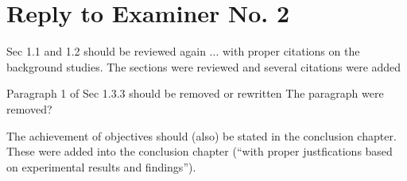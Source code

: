 \section*{Reply to Examiner No. 2}

\begin{replyheader}
\end{replyheader}  

\replyToComment
    {Sec 1.1 and 1.2 should be reviewed again ... with proper citations on the background studies.}
    {The sections were reviewed and several citations were added}

\replyToComment
    {Paragraph 1 of Sec 1.3.3 should be removed or rewritten}
    {The paragraph were removed?}
    
\replyToComment
    {The achievement of objectives should (also) be stated in the conclusion chapter. }
    {These were added into the conclusion chapter (``with proper justfications based on experimental results and findings'').}
    
